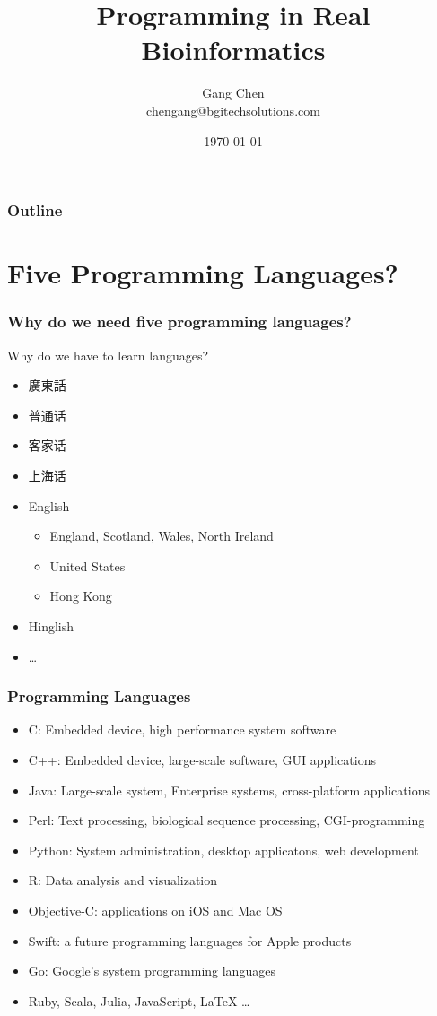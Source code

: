 \documentclass[UTF8]{beamer}
\title{Programming in Real Bioinformatics}
\author{Gang Chen\\ chengang@bgitechsolutions.com}
\date{\today}
\begin{document}
\begin{frame}
\titlepage
\end{frame}

\begin{frame}[t]\frametitle{Outline}
\tableofcontents[hideallsubsections]
\end{frame}

\section{Five Programming Languages?}
\begin{frame}
  \frametitle{Why do we need five programming languages?}
  \begin{block}{Why do we have to learn languages?}
  \begin{itemize}
    \item 廣東話
    \item 普通话
    \item 客家话
    \item 上海话
    \item English
    \begin{itemize}
      \item England, Scotland, Wales, North Ireland
      \item United States
      \item Hong Kong
    \end{itemize}
    \item Hinglish
    \item \ldots
  \end{itemize}
\end{block}
\end{frame}

\begin{frame}
  \frametitle{Programming Languages}
  \tiny
  \begin{itemize}
    \item C: Embedded device, high performance system software
    \item C++: Embedded device, large-scale software, GUI applications
    \item Java: Large-scale system, Enterprise systems, cross-platform applications
    \item Perl: Text processing, biological sequence processing, CGI-programming
    \item Python: System administration, desktop applicatons, web development
    \item R: Data analysis and visualization
    \item Objective-C: applications on iOS and Mac OS
    \item Swift: a future programming languages for Apple products
    \item Go: Google's system programming languages
    \item Ruby, Scala, Julia, JavaScript, LaTeX \ldots
  \end{itemize}
\end{frame}
\end{document}
